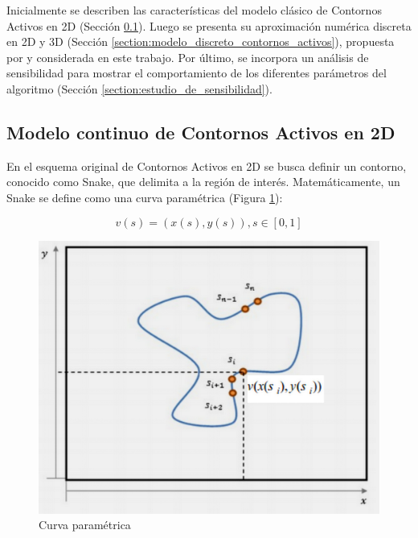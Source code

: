 Inicialmente se describen las características del modelo clásico de Contornos Activos en 2D \citep{kass1988snakes} (Sección \ref{section:modelo_continuo_contornos_activos}). Luego se presenta su aproximación numérica discreta en 2D y 3D (Sección \ref{section:modelo_discreto_contornos_activos}), propuesta por \cite{mcinerney2000t} y considerada en este trabajo. Por último, se incorpora un análisis de sensibilidad para mostrar el comportamiento de los diferentes parámetros del algoritmo (Sección \ref{section:estudio_de_sensibilidad}).

\subsection{Modelo continuo de Contornos Activos en 2D}\label{section:modelo_continuo_contornos_activos}

En el esquema original de Contornos Activos en 2D se busca definir un contorno, conocido como Snake, que delimita a la región de interés. Matemáticamente, un Snake se define como una curva paramétrica (Figura \ref{fig:curva_parametrica}):

%
\begin{equation}	
	v(s) = (x(s), y(s)), s \in [0,1]
\end{equation}
%


\begin{figure}[H]
	\centering
	\includegraphics[scale=0.05]{images/grafico_snake_parametrico.jpg}
	\caption{Curva paramétrica}
	\label{fig:curva_parametrica}
\end{figure}

